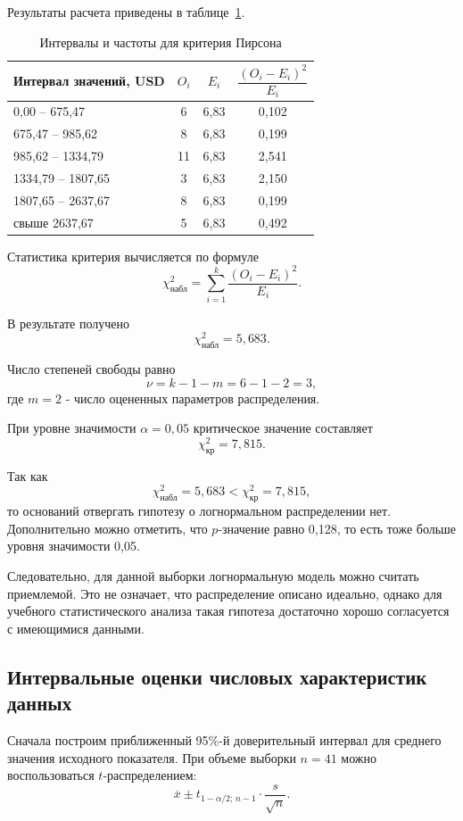 \documentclass[14pt,a4paper]{extarticle}
\begin{document}
Результаты расчета приведены в таблице~\ref{tab:chi}.

\begin{table}[H]
\centering
\caption{Интервалы и частоты для критерия Пирсона}
\label{tab:chi}
\begin{tabular}{|p{5.5cm}|c|c|c|}
\hline
Интервал значений, USD & $O_i$ & $E_i$ & $\dfrac{(O_i-E_i)^2}{E_i}$ \\ \hline
0,00 -- 675,47 & 6 & 6,83 & 0,102 \\ \hline
675,47 -- 985,62 & 8 & 6,83 & 0,199 \\ \hline
985,62 -- 1334,79 & 11 & 6,83 & 2,541 \\ \hline
1334,79 -- 1807,65 & 3 & 6,83 & 2,150 \\ \hline
1807,65 -- 2637,67 & 8 & 6,83 & 0,199 \\ \hline
свыше 2637,67 & 5 & 6,83 & 0,492 \\ \hline
\end{tabular}
\end{table}

Статистика критерия вычисляется по формуле
\begin{equation}
\chi^2_{\text{набл}} = \sum_{i=1}^k \frac{(O_i-E_i)^2}{E_i}.
\end{equation}

В результате получено
\[
\chi^2_{\text{набл}} = 5,683.
\]

Число степеней свободы равно
\[
\nu = k - 1 - m = 6 - 1 - 2 = 3,
\]
где $m=2$ - число оцененных параметров распределения.

При уровне значимости $\alpha = 0{,}05$ критическое значение составляет
\[
\chi^2_{\text{кр}} = 7,815.
\]

Так как
\[
\chi^2_{\text{набл}} = 5,683 < \chi^2_{\text{кр}} = 7,815,
\]
то оснований отвергать гипотезу о логнормальном распределении нет. Дополнительно можно отметить, что $p$-значение равно 0,128, то есть тоже больше уровня значимости 0,05.

Следовательно, для данной выборки логнормальную модель можно считать приемлемой. Это не означает, что распределение описано идеально, однако для учебного статистического анализа такая гипотеза достаточно хорошо согласуется с имеющимися данными.

\subsection{Интервальные оценки числовых характеристик данных}

Сначала построим приближенный 95\%-й доверительный интервал для среднего значения исходного показателя. При объеме выборки $n=41$ можно воспользоваться $t$-распределением:
\begin{equation}
\overline{x} \pm t_{1-\alpha/2;\,n-1} \cdot \frac{s}{\sqrt{n}}.
\end{equation}
\end{document}

